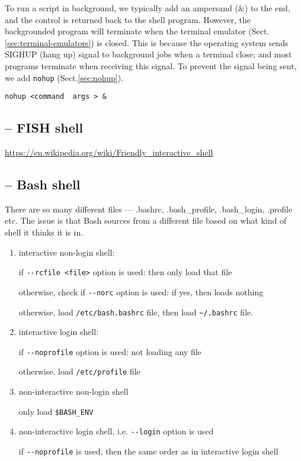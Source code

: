 To run a script in background, we typically add an ampersand (\&) to the end,
and the control is returned back to the shell program.
However, the backgrounded program will terminate when the terminal emulator
(Sect.\ref{sec:terminal-emulators}) is closed. This is because the operating
system sends SIGHUP (hang up) signal to background jobs when a terminal close;
and most programs terminate when receiving this signal. To prevent the signal
being sent, we add \verb!nohup! (Sect.\ref{sec:nohup}).

\begin{verbatim}
nohup <command  args > & 
\end{verbatim}

\subsection{-- FISH shell}
\label{sec:fish}

\url{https://en.wikipedia.org/wiki/Friendly_interactive_shell}

\subsection{-- Bash shell}
\label{sec:bash}

There are so many different files — .bashrc, .bash_profile, .bash_login,
.profile etc.
The issue is that Bash sources from a different file based on what kind of shell
it thinks it is in.
\begin{enumerate}
  \item interactive non-login shell:
  
  if \verb!--rcfile <file>! option is used: then only load that file
  
  otherwise, check if \verb!--norc! option is used: if yes, then loads nothing
  
  otherwise, load \verb!/etc/bash.bashrc! file, then load \verb!~/.bashrc! file.
  
  \item interactive login shell:
  
  if \verb!--noprofile! option is used: not loading any file
  
  otherwise, load \verb!/etc/profile! file
  
  \item non-interactive non-login shell
  
  only load \verb!$BASH_ENV! 
  
  \item non-interactive login shell, i.e. \verb!--login! option is used
  
  if \verb!--noprofile! is used, then the same order as in interactive login shell
  
\end{enumerate}

